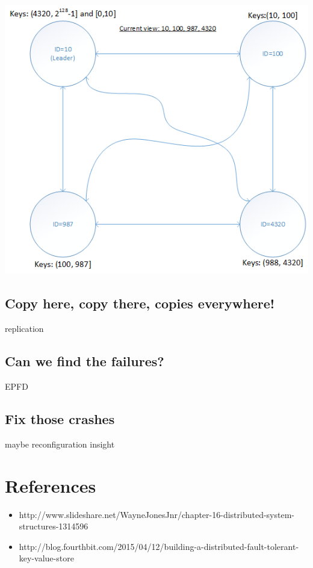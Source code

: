 \documentclass[a4paper, 11pt]{article}
\begin{document}
{\centering\includegraphics[scale = 0.7]{./figures/key-assignment.png}\par}

\subsection{Copy here, copy there, copies everywhere!}

\noindent replication

\subsection{Can we find the failures?}

\noindent EPFD

\subsection{Fix those crashes}

\noindent maybe reconfiguration insight

\section{References}
\begin{itemize}
	\item http://www.slideshare.net/WayneJonesJnr/chapter-16-distributed-system-structures-1314596
	\item 
	http://blog.fourthbit.com/2015/04/12/building-a-distributed-fault-tolerant-key-value-store
\end{itemize}
\end{document}
